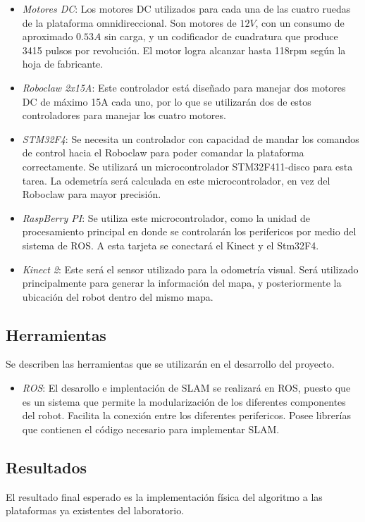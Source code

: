 \begin{itemize}
\item \textit{Motores DC}: Los motores DC utilizados para cada una de las cuatro ruedas de la plataforma omnidireccional. Son motores de $12V$, con un consumo de aproximado $0.53A$ sin carga, y un codificador de cuadratura que produce 3415 pulsos por revolución. El motor logra alcanzar hasta 118rpm según la hoja de fabricante.
\item \textit{Roboclaw 2x15A}: Este controlador está diseñado para manejar dos motores DC de máximo 15A cada uno, por lo que se utilizarán dos de estos controladores para manejar los cuatro motores.
\item \textit{STM32F4}: Se necesita un controlador con capacidad de mandar los comandos de control hacia el Roboclaw para poder comandar la plataforma correctamente. Se utilizará un microcontrolador STM32F411-disco para esta tarea. La odemetría será calculada en este microcontrolador, en vez del Roboclaw para mayor precisión.
\item \textit{RaspBerry PI}: Se utiliza este microcontrolador, como la unidad de procesamiento principal en donde se controlarán los perifericos por medio del sistema de ROS. A esta tarjeta se conectará el Kinect y el Stm32F4.
\item \textit{Kinect 2}: Este será el sensor utilizado para la odometría visual. Será utilizado principalmente para generar la información del mapa, y posteriormente la ubicación del robot dentro del mismo mapa.
\end{itemize}

\subsection{Herramientas}
Se describen las herramientas que se utilizarán en el desarrollo del proyecto.

\begin{itemize}
\item \textit{ROS}: El desarollo e implentación de SLAM se realizará en ROS, puesto que es un sistema que permite la modularización de los diferentes componentes del robot. Facilita la conexión entre los diferentes perifericos. Posee librerías que contienen el código necesario para implementar SLAM.
\end{itemize}

\subsection{Resultados}
El resultado final esperado es la implementación física del algoritmo a las plataformas ya existentes del laboratorio.

